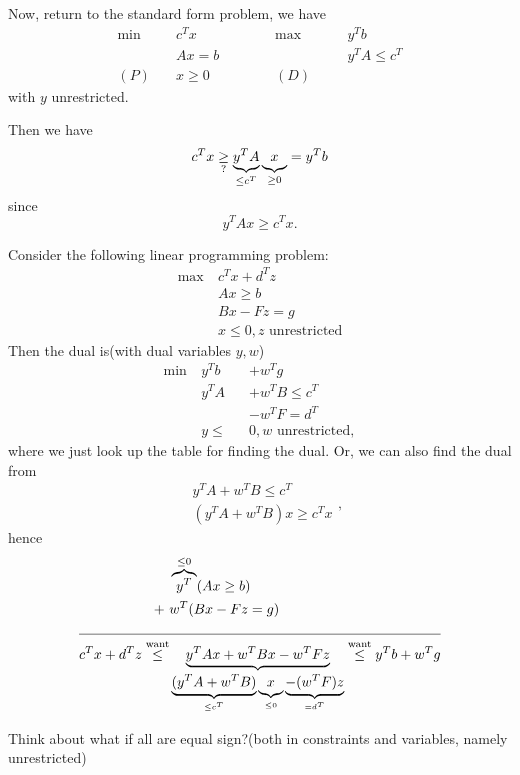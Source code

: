 Now, return to the standard form problem, we have
\[
	\begin{alignedat}{5}
		\min~&c^{T}x\qquad\qquad &&\max ~ &&y^{T}b\\
		&Ax = b && &&y^{T}A\leq c^{T}\\
		(P)\quad&x\geq  0 &&(D)\quad&&
	\end{alignedat}
\]
with \(y\) unrestricted.

Then we have
\[
	c^{T}x\underset{?}{\geq} \underbrace{y^{T}A}_{\leq c^{T}}\underbrace{\vphantom{y^{T}A}x}_{\geq 0} = y^{T} b
\]
since \[
	y^{T}Ax\geq c^{T}x.
\]

\begin{eg}
	Consider the following linear programming problem:
	\begin{align*}
		\max~ & c^{T}x+d^{T}z                  \\
		      & Ax\geq b                       \\
		      & Bx - Fz = g                    \\
		      & x\leq 0, z\text{ unrestricted}
	\end{align*}
	Then the dual is(with dual variables \(y, w\))
	\[
		\begin{alignedat}{3}
			\min~ & y^{T}b   &&+w^{T}g            \\
			& y^{T}A  &&+w^{T}B  \leq c^{T} \\
			& &&-w^{T}F = d^{T}    \\
			& y\leq &&0, w \text{ unrestricted},
		\end{alignedat}
	\]
	where we just look up the table for finding the dual. Or, we can also find the dual from
	\[
		\begin{split}
			&y^{T} A + w^{T} B\leq c^{T}\\
			&(y^{T} A+w^{T} B)x\geq c^{T} x
		\end{split},
	\]
	hence
	\[
		\begin{split}
			&\overbrace{y^{T}}^{\leq 0}(Ax\geq b)\\
			+\ &w^{T}(Bx - Fz = g)\\
			\cline{1-2}
			c^{T}x + d^{T}z\overset{\text{want}}{\leq}&\underbrace{y^{T}Ax + w^{T}Bx - w^{T} Fz}_{\underbrace{(y^{T} A + w^{T} B)}_{\leq c^{T}}\underbrace{\vphantom{y^{T}A}x}_{\leq 0} \underbrace{- (w^{T} F)z}_{=d^{T}}} \overset{\text{want}}{\leq} y^{T}b+w^{T}g
		\end{split}
	\]
\end{eg}
\begin{remark}
	Think about what if all are equal sign?(both in constraints and variables, namely unrestricted)
\end{remark}

